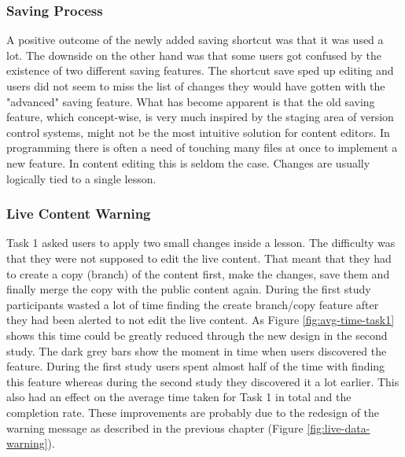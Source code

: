 

\subsubsection{Saving Process}
A positive outcome of the newly added saving shortcut was that it was used a lot. The downside on the other hand was that some users got confused by the existence of two different saving features. The shortcut save sped up editing and users did not seem to miss the list of changes they would have gotten with the "advanced" saving feature. What has become apparent is that the old saving feature, which concept-wise, is very much inspired by the staging area of version control systems, might not be the most intuitive solution for content editors. In programming there is often a need of touching many files at once to implement a new feature. In content editing this is seldom the case. Changes are usually logically tied to a single lesson.

\subsubsection{Live Content Warning} \label{sec:live-content-warning}
Task 1 asked users to apply two small changes inside a lesson. The difficulty was that they were not supposed to edit the live content. That meant that they had to create a copy (branch) of the content first, make the changes, save them and finally merge the copy with the public content again. During the first study participants wasted a lot of time finding the create branch/copy feature after they had been alerted to not edit the live content. As Figure \ref{fig:avg-time-task1} shows this time could be greatly reduced through the new design in the second study. The dark grey bars show the moment in time when users discovered the feature. During the first study users spent almost half of the time with finding this feature whereas during the second study they discovered it a lot earlier. This also had an effect on the average time taken for Task 1 in total and the completion rate. These improvements are probably due to the redesign of the warning message as described in the previous chapter (Figure \ref{fig:live-data-warning}).

